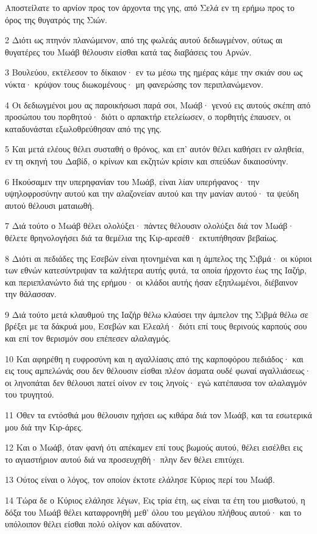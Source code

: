 \par Αποστείλατε το αρνίον προς τον άρχοντα της γης, από Σελά εν τη ερήμω προς το όρος της θυγατρός της Σιών.
\par 2 Διότι ως πτηνόν πλανώμενον, από της φωλεάς αυτού δεδιωγμένον, ούτως αι θυγατέρες του Μωάβ θέλουσιν είσθαι κατά τας διαβάσεις του Αρνών.
\par 3 Βουλεύου, εκτέλεσον το δίκαιον· εν τω μέσω της ημέρας κάμε την σκιάν σου ως νύκτα· κρύψον τους διωκομένους· μη φανερώσης τον περιπλανώμενον.
\par 4 Οι δεδιωγμένοι μου ας παροικήσωσι παρά σοι, Μωάβ· γενού εις αυτούς σκέπη από προσώπου του πορθητού· διότι ο αρπακτήρ ετελείωσεν, ο πορθητής έπαυσεν, οι καταδυνάσται εξωλοθρεύθησαν από της γης.
\par 5 Και μετά ελέους θέλει συσταθή ο θρόνος, και επ' αυτόν θέλει καθήσει εν αληθεία, εν τη σκηνή του Δαβίδ, ο κρίνων και εκζητών κρίσιν και σπεύδων δικαιοσύνην.
\par 6 Ηκούσαμεν την υπερηφανίαν του Μωάβ, είναι λίαν υπερήφανος· την υψηλοφροσύνην αυτού και την αλαζονείαν αυτού και την μανίαν αυτού· τα ψεύδη αυτού θέλουσι ματαιωθή.
\par 7 Διά τούτο ο Μωάβ θέλει ολολύξει· πάντες θέλουσιν ολολύξει διά τον Μωάβ· θέλετε θρηνολογήσει διά τα θεμέλια της Κιρ-αρεσέθ· εκτυπήθησαν βεβαίως.
\par 8 Διότι αι πεδιάδες της Εσεβών είναι ητονημέναι και η άμπελος της Σιβμά· οι κύριοι των εθνών κατεσύντριψαν τα καλήτερα αυτής φυτά, τα οποία ήρχοντο έως της Ιαζήρ, και περιεπλανώντο διά της ερήμου· οι κλάδοι αυτής ήσαν εξηπλωμένοι, διέβαινον την θάλασσαν.
\par 9 Διά τούτο μετά κλαυθμού της Ιαζήρ θέλω κλαύσει την άμπελον της Σιβμά θέλω σε βρέξει με τα δάκρυά μου, Εσεβών και Ελεαλή· διότι επί τους θερινούς καρπούς σου και επί τον θερισμόν σου επέπεσεν αλαλαγμός.
\par 10 Και αφηρέθη η ευφροσύνη και η αγαλλίασις από της καρποφόρου πεδιάδος· και εις τους αμπελώνάς σου δεν θέλουσιν είσθαι πλέον άσματα ουδέ φωναί αγαλλιάσεως· οι ληνοπάται δεν θέλουσι πατεί οίνον εν τοις ληνοίς· εγώ κατέπαυσα τον αλαλαγμόν του τρυγητού.
\par 11 Όθεν τα εντόσθιά μου θέλουσιν ηχήσει ως κιθάρα διά τον Μωάβ, και τα εσωτερικά μου διά την Κιρ-άρες.
\par 12 Και ο Μωάβ, όταν φανή ότι απέκαμεν επί τους βωμούς αυτού, θέλει εισέλθει εις το αγιαστήριον αυτού διά να προσευχηθή· πλην δεν θέλει επιτύχει.
\par 13 Ούτος είναι ο λόγος, τον οποίον έκτοτε ελάλησε Κύριος περί του Μωάβ.
\par 14 Τώρα δε ο Κύριος ελάλησε λέγων, Εις τρία έτη, ως είναι τα έτη του μισθωτού, η δόξα του Μωάβ θέλει καταφρονηθή μεθ' όλου του μεγάλου πλήθους αυτού· και το υπόλοιπον θέλει είσθαι πολύ ολίγον και αδύνατον.

